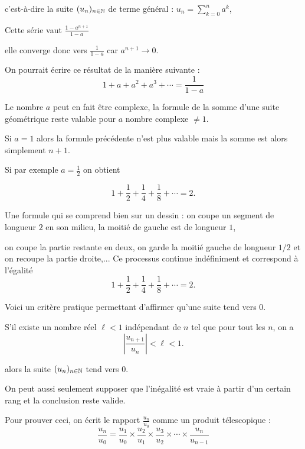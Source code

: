 c'est-à-dire la suite $(u_n)_{n\in \mathbb{N}}$ de terme général : 
$u_n= \sum_{k=0}^na^k$, 


\change

Cette série vaut $\frac{1-a^{n+1}}{1-a}$ 

\change

elle converge donc vers $\frac{1}{1-a}$ car $a^{n+1} \to 0$. 

\change

On pourrait écrire ce résultat de la manière suivante :
\[1+a+a^2+a^3 +\cdots = \frac{1}{1-a}\]

\change

Le nombre $a$ peut en fait être complexe, la formule de la somme d'une suite géométrique reste valable pour $a$ nombre complexe 
$\neq 1$.

\change

Si $a=1$ alors la formule précédente n'est plus valable mais
la somme
est alors simplement $n+1$.

\change

Si par exemple $a=\frac{1}{2}$ on obtient
  
  \[1+\frac{1}{2} +\frac{1}{4} +\frac{1}{8} +\cdots = 2 .\]


Une formule qui se comprend bien sur un dessin :
on coupe un segment de longueur $2$ en son milieu, la moitié de gauche est de longueur $1$,

on coupe la partie restante en deux, on garde la moitié gauche de longueur $1/2$ et on recoupe la partie droite,...
Ce processus continue indéfiniment et correspond à l'égalité 
 \[1+\frac{1}{2} +\frac{1}{4} +\frac{1}{8} +\cdots = 2 .\]





\diapo

Voici un critère pratique permettant d'affirmer qu'une suite tend vers $0$.

S'il existe un nombre réel $\ell<1$ indépendant de $n$ tel que pour tout les $n$, on a
\[ \left | \frac{u_{n+1}}{u_n}\right |  <\ell<1.\]


alors la suite $(u_n)_{n\in \mathbb{N}}$ tend vers $0$.

\change

On peut aussi seulement supposer que l'inégalité est vraie à partir d'un certain rang
et la conclusion reste valide.

\change

Pour prouver ceci, on écrit le rapport \(\frac{u_n}{u_0}\) comme un \og{} produit télescopique \fg{} :
 \[ \frac{u_n}{u_0}=\frac{u_1}{u_0} \times\frac{u_2}{u_1} \times\frac{u_3}{u_2} \times\cdots\times \frac{u_n}{u_{n-1}}\] 

